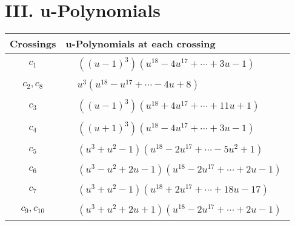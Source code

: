 \documentclass[1p]{elsarticle_modified}
\theoremstyle{definition}
\begin{document}
\newpage\renewcommand{\arraystretch}{1}
\centering \section*{ III. u-Polynomials}
\begin{tabular}{m{50pt}|m{274pt}}
Crossings & \hspace{64pt}u-Polynomials at each crossing \\
\hline $$\begin{aligned}c_{1}\end{aligned}$$&$\begin{aligned}
&((u-1)^3)(u^{18}-4 u^{17}+\cdots+3 u-1)
\end{aligned}$\\
\hline $$\begin{aligned}c_{2},c_{8}\end{aligned}$$&$\begin{aligned}
&u^3(u^{18}- u^{17}+\cdots-4 u+8)
\end{aligned}$\\
\hline $$\begin{aligned}c_{3}\end{aligned}$$&$\begin{aligned}
&((u-1)^3)(u^{18}+4 u^{17}+\cdots+11 u+1)
\end{aligned}$\\
\hline $$\begin{aligned}c_{4}\end{aligned}$$&$\begin{aligned}
&((u+1)^3)(u^{18}-4 u^{17}+\cdots+3 u-1)
\end{aligned}$\\
\hline $$\begin{aligned}c_{5}\end{aligned}$$&$\begin{aligned}
&(u^3+u^2-1)(u^{18}-2 u^{17}+\cdots-5 u^2+1)
\end{aligned}$\\
\hline $$\begin{aligned}c_{6}\end{aligned}$$&$\begin{aligned}
&(u^3- u^2+2 u-1)(u^{18}-2 u^{17}+\cdots+2 u-1)
\end{aligned}$\\
\hline $$\begin{aligned}c_{7}\end{aligned}$$&$\begin{aligned}
&(u^3+u^2-1)(u^{18}+2 u^{17}+\cdots+18 u-17)
\end{aligned}$\\
\hline $$\begin{aligned}c_{9},c_{10}\end{aligned}$$&$\begin{aligned}
&(u^3+u^2+2 u+1)(u^{18}-2 u^{17}+\cdots+2 u-1)
\end{aligned}$\\
\hline
\end{tabular}\newpage\renewcommand{\arraystretch}{1}
\end{document}
